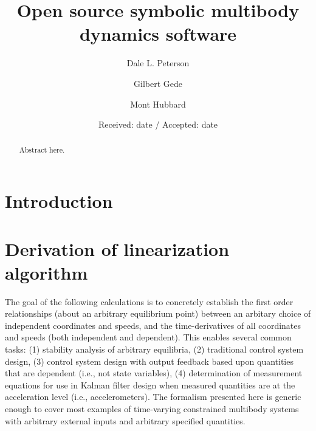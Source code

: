 \documentclass{svjour3}                     %
\begin{document}
\title{Open source symbolic multibody dynamics software}


\author{Dale L. Peterson\and Gilbert Gede\and Mont Hubbard}


\date{Received: date / Accepted: date}

\maketitle

\begin{abstract}
  Abstract here.
\end{abstract}

\section{Introduction}
\label{intro}

\section{Derivation of linearization algorithm}
\label{derivations}
The goal of the following calculations is to concretely establish the first
order relationships (about an arbitrary equilibrium point) between an arbitary
choice of independent coordinates and speeds, and the time-derivatives of all
coordinates and speeds (both independent and dependent).  This enables several
common tasks: (1) stability analysis of arbitrary equilibria, (2) traditional
control system design, (3) control system design with output feedback based
upon quantities that are dependent (i.e., not state variables), (4)
determination of measurement equations for use in Kalman filter design when
measured quantities are at the acceleration level (i.e., accelerometers).  The
formalism presented here is generic enough to cover most examples of
time-varying constrained multibody systems with arbitrary external inputs and
arbitrary specified quantities.
\end{document}
